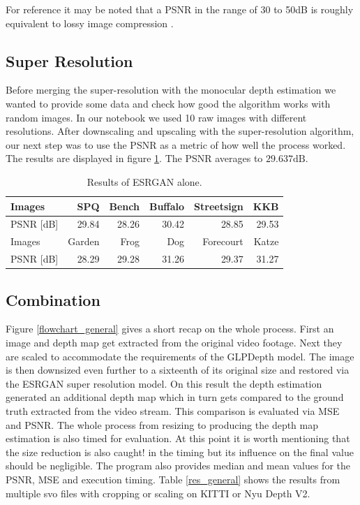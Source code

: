For reference it may be noted that a PSNR in the range of 30 to 50dB is roughly equivalent to lossy image compression \cite{psnr_ref}.

\subsection{Super Resolution}

Before merging the super-resolution with the monocular depth estimation we wanted to provide some data and check how good the algorithm works with random images.
In our notebook we used 10 raw images with different resolutions. After downscaling and upscaling with the super-resolution algorithm, our next step was to use the PSNR as a metric of how well the process worked. The results are displayed in figure \ref*{res_esrgan}. The PSNR averages to $29.637\mathrm{dB}$.

\begin{table}[ht!]
    \begin{center}
        \begin{tabular}{ l | r r r r r }
            Images      & SPQ   & Bench & Buffalo   & Streetsign    & KKB   \\
            \hline
            PSNR [dB]   & 29.84 & 28.26 & 30.42     & 28.85         & 29.53 \\
            Images      & Garden    & Frog  & Dog   & Forecourt & Katze \\
            \hline
            PSNR [dB]   & 28.29     & 29.28 & 31.26 & 29.37     & 31.27 \\
        \end{tabular}
        \caption{Results of ESRGAN alone.} \label{res_esrgan}
    \end{center}
\end{table}


\subsection{Combination} \label{general_subsection}

Figure \ref*{flowchart_general} gives a short recap on the whole process. First an image and depth map get extracted from the original video footage. Next they are scaled to accommodate the requirements of the GLPDepth model. The image is then downsized even further to a sixteenth of its original size and restored via the ESRGAN super resolution model. On this result the depth estimation generated an additional depth map which in turn gets compared to the ground truth extracted from the video stream. This comparison is evaluated via MSE and PSNR. The whole process from resizing to producing the depth map estimation is also timed for evaluation. At this point it is worth mentioning that the size reduction is also caught! in the timing but its influence on the final value should be negligible. The program also provides median and mean values for the PSNR, MSE and execution timing.
Table \ref*{res_general} shows the results from multiple svo files with cropping or scaling on KITTI or Nyu Depth V2.

